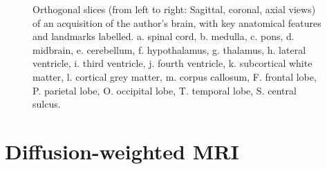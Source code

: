 \begin{figure}[hbt!]
  
  \caption[Neuroanatomical landmarks on $T_1$-weighted MRI]{Orthogonal slices (from left to right: Sagittal, coronal, axial views) of an  acquisition of the author's brain, with key anatomical features and landmarks labelled. a. spinal cord, b. medulla, c. pons, d. midbrain, e. cerebellum, f. hypothalamus, g. thalamus, h. lateral ventricle, i. third ventricle, j. fourth ventricle, k. subcortical white matter, l. cortical grey matter, m. corpus callosum, F. frontal lobe, P. parietal lobe, O. occipital lobe, T. temporal lobe, S. central sulcus.}
  \label{fig:ortho}
\end{figure}

\section{Diffusion-weighted MRI}\label{sec:dmri}


